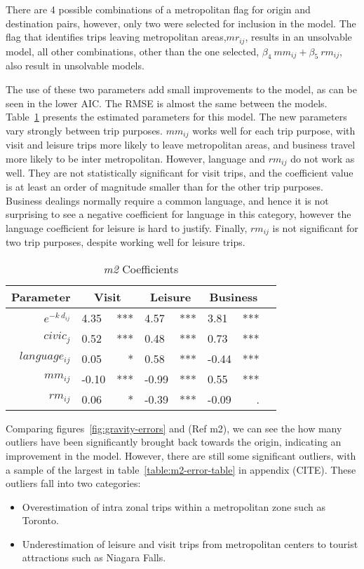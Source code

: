 There are 4 possible combinations of a metropolitan flag for origin and destination pairs, however, only two were selected for inclusion in the model. The flag that identifies trips leaving metropolitan areas,$mr_{ij}$, results in an unsolvable model, all other combinations, other than the one selected, $\beta_4~mm_{ij} + \beta_5~rm_{ij}$, also result in unsolvable models. 

The use of these two parameters add small improvements to the model, as can be seen in the lower AIC. The RMSE is almost the same between the models. Table~\ref{table:m2-coeff} presents the estimated parameters for this model. The new parameters vary strongly between trip purposes. 
$mm_{ij}$  works well for each trip purpose, with visit and leisure trips more likely to leave metropolitan areas, and business travel more likely to be inter metropolitan. However, language and $rm_{ij}$  do not work as well. They are not statistically significant for visit trips, and the coefficient value is at least an order of magnitude smaller than for the other trip purposes. Business dealings normally require a common language, and hence it is not surprising to see a negative coefficient for language in this category, however the language coefficient for leisure is hard to justify. Finally, $rm_{ij}$  is not significant for two trip purposes, despite working well for leisure trips. 

\begin{table}[H]
\centering
\caption{\textit{m2} Coefficients}
\label{table:m2-coeff}
\begin{tabular}{@{}rlrlrlrl@{}}
  \toprule
 Parameter & \multicolumn{2}{c}{Visit} & \multicolumn{2}{c}{Leisure} & \multicolumn{2}{c}{Business} &  \\ \midrule
  $e^{-k\ d_{ij}}$ 	& 4.35 & *** & 4.57 & *** & 3.81 & *** \\  
  $civic_j$ 		& 0.52 	& *** & 0.48 & *** & 0.73 & *** \\  
  $language_{ij}$ 	& 0.05 & * & 0.58 & *** & -0.44 & *** \\ 
  $mm_{ij}$  		& -0.10 & *** & -0.99 & *** & 0.55 & *** \\ 
  $rm_{ij}$			& 0.06 & * & -0.39 & *** & -0.09 & . \\  
   \bottomrule
\end{tabular}
\end{table}

Comparing figures~\ref{fig:gravity-errors} and (Ref m2), we can see the how many outliers have been significantly brought back towards the origin, indicating an improvement in the model. However, there are still some significant outliers, with a sample of the largest in table~\ref{table:m2-error-table} in appendix (CITE). These outliers fall into two categories:
\begin{itemize}
\item Overestimation of intra zonal trips within a metropolitan zone such as Toronto.
\item Underestimation of leisure and visit trips from metropolitan centers to tourist attractions such as Niagara Falls.
\end{itemize}

